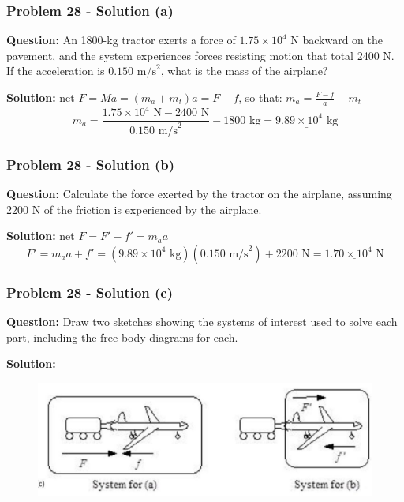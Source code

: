 \documentclass{beamer}
\begin{document}
\begin{}
\begin{frame}
\frametitle{Problem 28 - Solution (a)}
\textbf{Question:} An 1800-kg tractor exerts a force of $1.75 \times 10^{4} \text{ N}$ backward on the pavement, and the system experiences forces resisting motion that total 2400 N. If the acceleration is $0.150 \text{ m/s}^{2}$, what is the mass of the airplane?

\vspace{0.5cm}

\textbf{Solution:}
net $F = Ma = (m_a + m_t)a = F - f$, so that: $m_a = \frac{F - f}{a} - m_t$
\begin{equation*}
m_a = \frac{1.75 \times 10^{4} \text{ N} - 2400 \text{ N}}{0.150 \text{ m/s}^{2}} - 1800 \text{ kg} = \underline{9.89 \times 10^{4} \text{ kg}}
\end{equation*}
\end{frame}

\begin{frame}
\frametitle{Problem 28 - Solution (b)}
\textbf{Question:} Calculate the force exerted by the tractor on the airplane, assuming 2200 N of the friction is experienced by the airplane.

\vspace{0.5cm}

\textbf{Solution:}
net $F = F' - f' = m_a a$
\begin{equation*}
F' = m_a a + f' = (9.89 \times 10^{4} \text{ kg})(0.150 \text{ m/s}^{2}) + 2200 \text{ N} = \underline{1.70 \times 10^{4} \text{ N}}
\end{equation*}
\end{frame}

\begin{frame}
\frametitle{Problem 28 - Solution (c)}
\textbf{Question:} Draw two sketches showing the systems of interest used to solve each part, including the free-body diagrams for each.

\vspace{0.5cm}

\textbf{Solution:}

\begin{figure}
    \centering
    \includegraphics[width=0.5\linewidth]{Screenshot 2024-10-18 111935.png}
\end{figure}
\end{frame}


\end{}
\end{document}
